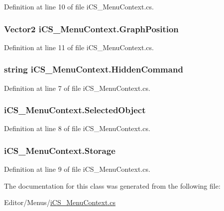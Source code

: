Definition at line 10 of file i\+C\+S\+\_\+\+Menu\+Context.\+cs.

\hypertarget{classi_c_s___menu_context_ad88d30549c87db47baf49398c832a3f6}{
\subsubsection[{Graph\+Position}]{\setlength{\rightskip}{0pt plus 5cm}Vector2 i\+C\+S\+\_\+\+Menu\+Context.\+Graph\+Position}}\label{classi_c_s___menu_context_ad88d30549c87db47baf49398c832a3f6}


Definition at line 11 of file i\+C\+S\+\_\+\+Menu\+Context.\+cs.

\hypertarget{classi_c_s___menu_context_a6c636698e7d84ff8b65adca8b346903a}{
\subsubsection[{Hidden\+Command}]{\setlength{\rightskip}{0pt plus 5cm}string i\+C\+S\+\_\+\+Menu\+Context.\+Hidden\+Command}}\label{classi_c_s___menu_context_a6c636698e7d84ff8b65adca8b346903a}


Definition at line 7 of file i\+C\+S\+\_\+\+Menu\+Context.\+cs.

\hypertarget{classi_c_s___menu_context_aac907340e44ae6e34f94e8e3ecf8a08c}{
\subsubsection[{Selected\+Object}]{ i\+C\+S\+\_\+\+Menu\+Context.\+Selected\+Object}}\label{classi_c_s___menu_context_aac907340e44ae6e34f94e8e3ecf8a08c}


Definition at line 8 of file i\+C\+S\+\_\+\+Menu\+Context.\+cs.

\hypertarget{classi_c_s___menu_context_a919357230d82a0cbc17418cf2ef599f5}{
\subsubsection[{Storage}]{ i\+C\+S\+\_\+\+Menu\+Context.\+Storage}}\label{classi_c_s___menu_context_a919357230d82a0cbc17418cf2ef599f5}


Definition at line 9 of file i\+C\+S\+\_\+\+Menu\+Context.\+cs.



The documentation for this class was generated from the following file\+:\begin{DoxyCompactItemize}
\item 
Editor/\+Menus/\hyperlink{i_c_s___menu_context_8cs}{i\+C\+S\+\_\+\+Menu\+Context.\+cs}\end{DoxyCompactItemize}
